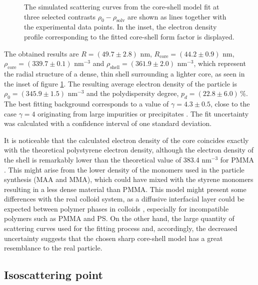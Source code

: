 \begin{figure}%
	\centering
		
		\caption[Core-shell model fit to the PS-COOH particles experimental data.]{The simulated scattering curves from the core-shell model fit at three selected contrasts $\rho_0-\rho_{\text{solv}}$ are shown as lines together with the experimental data points. In the inset, the electron density profile corresponding to the fitted core-shell form factor is displayed.}
		\label{fig:KiskerSAXSCoreshellFit}
\end{figure}

The obtained results are \(R=\left(49.7 \pm 2.8\right) \) nm, \(R_{\text{core}}=\left(44.2 \pm 0.9\right) \) nm, \(\rho_{\text{core}}=\left(339.7 \pm 0.1\right)\) nm\(^{-3}\) and \(\rho_{\text{shell}}=\left(361.9 \pm 2.0\right)\) nm\(^{-3}\), which represent the radial structure of a dense, thin shell surrounding a lighter core, as seen in the inset of figure \ref{fig:KiskerSAXSCoreshellFit}. The resulting average electron density of the particle is \(\rho_{0}=\left(345.9 \pm 1.5\right)\) nm\(^{-3}\) and the polydispersity degree, \(p_d=\left(22.8\pm 6.0\right)\,\%\). The best fitting background corresponds to a value of \( \gamma = 4.3\pm 0.5 \), close to the case \( \gamma = 4 \) originating from large impurities or precipitates \citep{pedersen_determination_1994}. The fit uncertainty was calculated with a confidence interval of one standard deviation. 

It is noticeable that the calculated electron density of the core coincides exactly with the theoretical polystyrene electron density, although the electron density of the shell is remarkably lower than the theoretical value of 383.4 nm\(^{-3}\) for PMMA \citep{ballauff_saxs_2001-1}. This might arise from the lower density of the monomers used in the particle synthesis (MAA and MMA), which could have mixed with the styrene monomers resulting in a less dense material than PMMA. This model might present some differences with the real colloid system, as a diffusive interfacial layer could be expected between polymer phases in colloids \citep{dingenouts_interface_1994}, especially for incompatible polymers such as PMMA and PS. On the other hand, the large quantity of scattering curves used for the fitting process and, accordingly, the decreased uncertainty suggests that the chosen sharp core-shell model has a great resemblance to the real particle.

\subsection{Isoscattering point}

